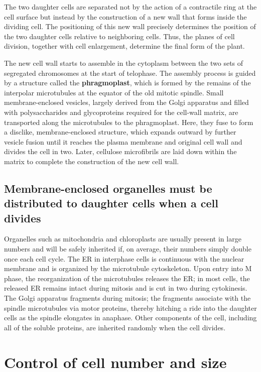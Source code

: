 The two daughter cells are
separated not by the action of a contractile ring at the cell surface but
instead by the construction of a new wall that forms inside the dividing
cell. The positioning of this new wall precisely determines the position of
the two daughter cells relative to neighboring cells. Thus, the planes of
cell division, together with cell enlargement, determine the final form of
the plant.

The new cell wall starts to assemble in the cytoplasm between the two
sets of segregated chromosomes at the start of telophase. The assembly
process is guided by a structure called the \textbf{phragmoplast}, which is formed
by the remains of the interpolar microtubules at the equator of the old
mitotic spindle. Small membrane-enclosed vesicles, largely derived from
the Golgi apparatus and filled with polysaccharides and glycoproteins
required for the cell-wall matrix, are transported along the microtubules
to the phragmoplast. Here, they fuse to form a disclike, membrane-enclosed
structure, which expands outward by further vesicle fusion
until it reaches the plasma membrane and original cell wall and divides
the cell in two. Later, cellulose microfibrils are laid down
within the matrix to complete the construction of the new cell wall.

\subsection{Membrane-enclosed organelles must be distributed to daughter cells when a cell divides}

Organelles such as mitochondria and chloroplasts are usually present in
large numbers and will be safely inherited if, on average, their numbers
simply double once each cell cycle. The ER in interphase cells is continuous
with the nuclear membrane and is organized by the microtubule
cytoskeleton. Upon entry into M phase, the reorganization
of the microtubules releases the ER; in most cells, the released
ER remains intact during mitosis and is cut in two during cytokinesis.
The Golgi apparatus fragments during mitosis; the fragments associate
with the spindle microtubules via motor proteins, thereby hitching a ride
into the daughter cells as the spindle elongates in anaphase. Other components
of the cell, including all of the soluble proteins, are inherited
randomly when the cell divides.

\section{Control of cell number and size}

